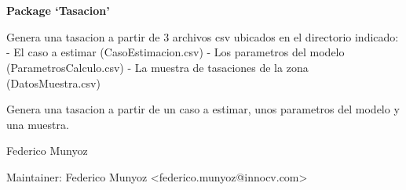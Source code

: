 \documentclass[a4paper]{book}
\begin{document}
\chapter*{}
\begin{center}
{\textbf{\huge Package `Tasacion'}}
\par\bigskip{\large \today}
\end{center}
\begin{description}
\raggedright{}
\item[Type]
\item[Title]
\item[Version]
\item[Date]
\item[Author]\AsIs{}
\item[Maintainer]\AsIs{}
\item[Description]
\item[License]\AsIs{---}
\item[Encoding]
\end{description}
%
\begin{Description}\relax
Genera una tasacion a partir de 3 archivos csv ubicados en el directorio indicado:
- El caso a estimar (CasoEstimacion.csv)
- Los parametros del modelo (ParametrosCalculo.csv)
- La muestra de tasaciones de la zona (DatosMuestra.csv)
\end{Description}
%
\begin{Details}\relax

Genera una tasacion a partir de un caso a estimar, unos parametros del modelo y una muestra.
\end{Details}
%
\begin{Author}\relax
Federico Munyoz

Maintainer: Federico Munyoz <federico.munyoz@innocv.com>
\end{Author}
\end{document}
